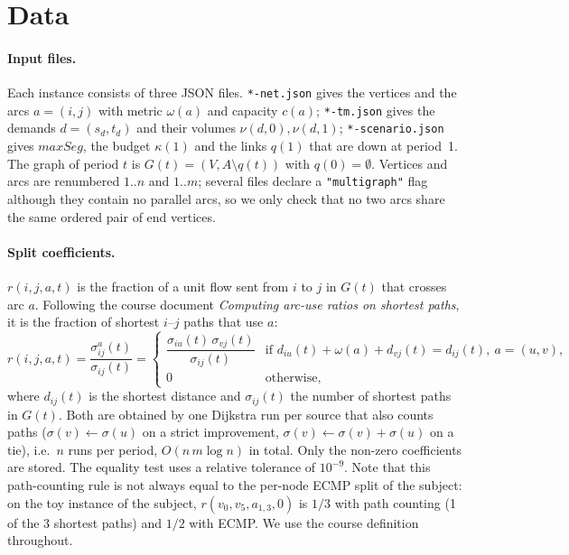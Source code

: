 \documentclass[11pt,a4paper]{article}
\begin{document}
\section{Data}

\paragraph{Input files.} Each instance consists of three JSON files.
\texttt{*-net.json} gives the vertices and the arcs $a=(i,j)$ with metric $\omega(a)$ and capacity
$c(a)$; \texttt{*-tm.json} gives the demands $d=(s_d,t_d)$ and their volumes $\nu(d,0),\nu(d,1)$;
\texttt{*-scenario.json} gives $maxSeg$, the budget $\kappa(1)$ and the links $q(1)$ that are down at
period~1. The graph of period $t$ is $G(t)=(V,A\setminus q(t))$ with $q(0)=\emptyset$. Vertices and arcs are
renumbered $1..n$ and $1..m$; several files declare a \texttt{"multigraph"} flag although they contain
no parallel arcs, so we only check that no two arcs share the same ordered pair of end vertices.

\paragraph{Split coefficients.} $r(i,j,a,t)$ is the fraction of a unit flow sent from $i$ to $j$ in
$G(t)$ that crosses arc $a$. Following the course document \emph{Computing arc-use ratios on shortest
paths}, it is the fraction of shortest $i$--$j$ paths that use $a$:
\[
r(i,j,a,t)=\frac{\sigma^a_{ij}(t)}{\sigma_{ij}(t)}=
\begin{cases}
\dfrac{\sigma_{iu}(t)\,\sigma_{vj}(t)}{\sigma_{ij}(t)} & \text{if } d_{iu}(t)+\omega(a)+d_{vj}(t)=d_{ij}(t),\ a=(u,v),\\[6pt]
0 & \text{otherwise,}
\end{cases}
\]
where $d_{ij}(t)$ is the shortest distance and $\sigma_{ij}(t)$ the number of shortest paths in $G(t)$.
Both are obtained by one Dijkstra run per source that also counts paths ($\sigma(v)\leftarrow\sigma(u)$
on a strict improvement, $\sigma(v)\leftarrow\sigma(v)+\sigma(u)$ on a tie), i.e.\ $n$ runs per period,
$O(n\,m\log n)$ in total. Only the non-zero coefficients are stored. The equality test uses a relative
tolerance of $10^{-9}$. Note that this path-counting rule is not always equal to the per-node ECMP split
of the subject: on the toy instance of the subject, $r(v_0,v_5,a_{1,3},0)$ is $1/3$ with path counting
(1 of the 3 shortest paths) and $1/2$ with ECMP. We use the course definition throughout.
\end{document}
